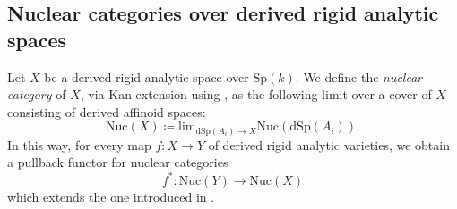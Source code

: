 \documentclass[oneside, hidelinks, 12pt, a4paper,reqno]{amsart}
\theoremstyle{plain}
\theoremstyle{definition}
\newtheorem{definition}[definition]{Definition}
\theoremstyle{plain}
\newcommand{\dSp}{\mathrm{dSp}}
\newcommand{\Nuc}{\mathrm{Nuc}}
\newcommand{\Lim}{\mathrm{lim}}
\begin{document}


\subsection{Nuclear categories over derived rigid analytic spaces}

Let $X$ be a derived rigid analytic space over $\mathrm{Sp}(k)$. We define the \emph{nuclear category} of $X$, via Kan extension using , as the following limit over a cover of $X$ consisting of derived affinoid spaces:
\begin{equation*}
    \Nuc(X) \coloneqq \Lim_{\dSp(A_{i})\to X}\Nuc(\dSp(A_{i})).
\end{equation*}
In this way, for every map $f\colon X \to Y$ of derived rigid analytic varieties, we obtain a pullback functor for nuclear categories
\begin{equation}\label{eq: pullback}
    f^{\ast}\colon \Nuc(Y) \to \Nuc(X)
\end{equation}
which extends the one introduced in .
\end{document}
